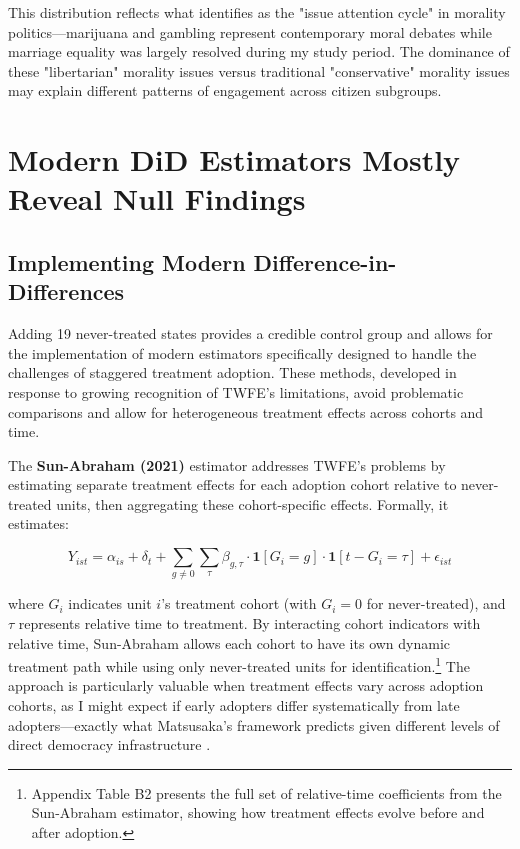 \documentclass[12pt,letterpaper,oneside]{book}
\begin{document}
This distribution reflects what \citet{haider2006framing} identifies as the "issue attention cycle" in morality politics—marijuana and gambling represent contemporary moral debates while marriage equality was largely resolved during my study period. The dominance of these "libertarian" morality issues versus traditional "conservative" morality issues may explain different patterns of engagement across citizen subgroups.

\section{Modern DiD Estimators Mostly Reveal Null Findings}

\subsection{Implementing Modern Difference-in-Differences}

Adding 19 never-treated states provides a credible control group and allows for the implementation of modern estimators specifically designed to handle the challenges of staggered treatment adoption. These methods, developed in response to growing recognition of TWFE's limitations, avoid problematic comparisons and allow for heterogeneous treatment effects across cohorts and time.

The \textbf{Sun-Abraham (2021)} estimator addresses TWFE's problems by estimating separate treatment effects for each adoption cohort relative to never-treated units, then aggregating these cohort-specific effects. Formally, it estimates:

$$ Y_{ist} = \alpha_{is} + \delta_t + \sum_{g \neq 0} \sum_{\tau} \beta_{g,\tau} \cdot \mathbf{1}[G_i = g] \cdot \mathbf{1}[t - G_i = \tau] + \epsilon_{ist} $$

where $G_i$ indicates unit $i$'s treatment cohort (with $G_i = 0$ for never-treated), and $\tau$ represents relative time to treatment. By interacting cohort indicators with relative time, Sun-Abraham allows each cohort to have its own dynamic treatment path while using only never-treated units for identification.\footnote{Appendix Table B2 presents the full set of relative-time coefficients from the Sun-Abraham estimator, showing how treatment effects evolve before and after adoption.} The approach is particularly valuable when treatment effects vary across adoption cohorts, as I might expect if early adopters differ systematically from late adopters—exactly what Matsusaka's framework predicts given different levels of direct democracy infrastructure \citep{matsusaka2018public}.
\end{document}
